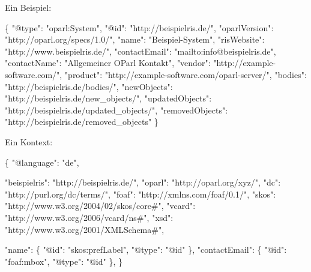 \documentclass[,a4paper]{article}
\newenvironment{Shaded}{}{}
\newcommand{\DataTypeTok}[1]{\textcolor[rgb]{0.56,0.13,0.00}{{#1}}}
\newcommand{\StringTok}[1]{\textcolor[rgb]{0.25,0.44,0.63}{{#1}}}
\newcommand{\NormalTok}[1]{{#1}}
\begin{document}
Ein Beispiel:

\begin{Shaded}
\begin{Highlighting}[]
\NormalTok{\{}
    \DataTypeTok{"@type"}\NormalTok{: }\StringTok{"oparl:System"}\NormalTok{,}
    \DataTypeTok{"@id"}\NormalTok{: }\StringTok{"http://beispielris.de/"}\NormalTok{,}
    \DataTypeTok{"oparlVersion"}\NormalTok{: }\StringTok{"http://oparl.org/specs/1.0/"}\NormalTok{,}
    \DataTypeTok{"name"}\NormalTok{: }\StringTok{"Beispiel-System"}\NormalTok{,}
    \DataTypeTok{"risWebsite"}\NormalTok{: }\StringTok{"http://www.beispielris.de/"}\NormalTok{,}
    \DataTypeTok{"contactEmail"}\NormalTok{: }\StringTok{"mailto:info@beispielris.de"}\NormalTok{,}
    \DataTypeTok{"contactName"}\NormalTok{: }\StringTok{"Allgemeiner OParl Kontakt"}\NormalTok{,}
    \DataTypeTok{"vendor"}\NormalTok{: }\StringTok{"http://example-software.com/"}\NormalTok{,}
    \DataTypeTok{"product"}\NormalTok{: }\StringTok{"http://example-software.com/oparl-server/"}\NormalTok{,}
    \DataTypeTok{"bodies"}\NormalTok{: }\StringTok{"http://beispielris.de/bodies/"}\NormalTok{,}
    \DataTypeTok{"newObjects"}\NormalTok{: }\StringTok{"http://beispielris.de/new_objects/"}\NormalTok{,}
    \DataTypeTok{"updatedObjects"}\NormalTok{: }\StringTok{"http://beispielris.de/updated_objects/"}\NormalTok{,}
    \DataTypeTok{"removedObjects"}\NormalTok{: }\StringTok{"http://beispielris.de/removed_objects"}
\NormalTok{\}}
\end{Highlighting}
\end{Shaded}

Ein Kontext:

\begin{Shaded}
\begin{Highlighting}[]
\NormalTok{\{}
    \DataTypeTok{"@language"}\NormalTok{: }\StringTok{"de"}\NormalTok{,}

    \DataTypeTok{"beispielris"}\NormalTok{: }\StringTok{"http://beispielris.de/"}\NormalTok{,}
    \DataTypeTok{"oparl"}\NormalTok{: }\StringTok{"http://oparl.org/xyz/"}\NormalTok{,}
    \DataTypeTok{"dc"}\NormalTok{: }\StringTok{"http://purl.org/dc/terms/"}\NormalTok{,}
    \DataTypeTok{"foaf"}\NormalTok{: }\StringTok{"http://xmlns.com/foaf/0.1/"}\NormalTok{,}
    \DataTypeTok{"skos"}\NormalTok{: }\StringTok{"http://www.w3.org/2004/02/skos/core#"}\NormalTok{,}
    \DataTypeTok{"vcard"}\NormalTok{: }\StringTok{"http://www.w3.org/2006/vcard/ns#"}\NormalTok{,}
    \DataTypeTok{"xsd"}\NormalTok{: }\StringTok{"http://www.w3.org/2001/XMLSchema#"}\NormalTok{,}

    \DataTypeTok{"name"}\NormalTok{: \{}
        \DataTypeTok{"@id"}\NormalTok{: }\StringTok{"skos:prefLabel"}\NormalTok{,}
        \DataTypeTok{"@type"}\NormalTok{: }\StringTok{"@id"}
    \NormalTok{\},}
    \DataTypeTok{"contactEmail"}\NormalTok{: \{}
        \DataTypeTok{"@id"}\NormalTok{: }\StringTok{"foaf:mbox"}\NormalTok{,}
        \DataTypeTok{"@type"}\NormalTok{: }\StringTok{"@id"}
    \NormalTok{\},}
\NormalTok{\}}
\end{Highlighting}
\end{Shaded}
\end{document}
